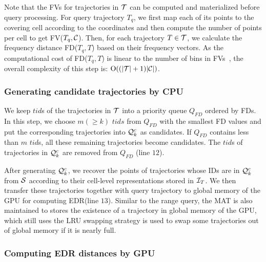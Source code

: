 \documentclass[10pt,conference,letterpaper]{IEEEtran}
\newcommand{\rangeq}{{{\cal Q}_r}\xspace}
\newcommand{\simcand}{{{\cal Q}_k^c}\xspace}
\newcommand{\alltraj}{{{\cal T}}\xspace}
\newcommand{\allcell}{{\cal C}\xspace}
\newcommand{\trajtable}{{\cal S}\xspace}
\newcommand{\trajindex}{{{\cal I}_T}\xspace}
\newcommand{\bigoh}{{\rm O}\xspace}
\begin{document}
Note that the FVs for trajectories in $\alltraj$ can be computed and materialized before query processing. For query trajectory $T_q$, we first map each of its points to the covering cell according to the coordinates and then compute the number of points per cell to get FV($T_q, \allcell$). Then, for each trajectory $T\in\alltraj$, we calculate the frequency distance FD($T_q, T$) based on their frequency vectors.
%
As the computational cost of FD($T_q, T$) is linear to the number of bins in FVs~\cite{DBLP:conf/sigmod/ChenOO05}, the overall complexity of this step is: $\bigoh((|\alltraj|+1)|\allcell|)$.







\subsubsection{Generating candidate trajectories by CPU}
We keep $tid$s of the trajectories in $\alltraj$ into a priority queue ${Q}_{FD}$ ordered by FDs. In this step, we choose $m(\geq k)$  $tids$ from ${Q}_{FD}$ with the smallest FD values and put the corresponding trajectories into $\simcand$ as candidates. If ${Q}_{FD}$ contains less than $m$ $tid$s, all these remaining trajectories become candidates. The $tid$s of trajectories in $\simcand$ are removed from ${Q}_{FD}$ (line $12$).

After generating $\simcand$, we recover the points of trajectories whose IDs are in $\simcand$ from $\trajtable$ according to their cell-level representations stored in $\trajindex$. We then transfer these trajectories together with query trajectory to global memory of the GPU for computing EDR(line $13$).
Similar to the range query, the MAT is also maintained to stores the existence of a trajectory in global memory of the GPU, which still uses the LRU swapping strategy is used to swap some trajectories out of global memory if it is nearly full.




\subsubsection{Computing EDR distances by GPU}
\end{document}

